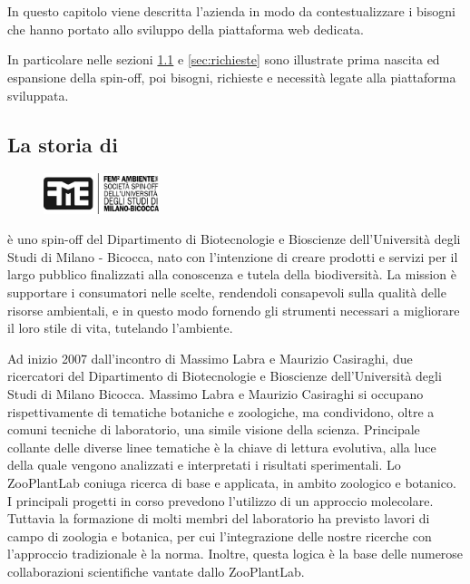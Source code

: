 \chapter{\fem}
\label{chp:fem}

In questo capitolo viene descritta l'azienda \textbf{\femsrl} in modo da contestualizzare i bisogni che hanno portato allo sviluppo della piattaforma web dedicata.

In particolare nelle sezioni \ref{sec:storia-fem} e \ref{sec:richieste} sono illustrate prima nascita ed espansione della spin-off, poi bisogni, richieste e necessità legate alla piattaforma sviluppata.

\section{La storia di \fem}
\label{sec:storia-fem}

\begin{figure}
  \begin{center}
    \includegraphics[width=0.3\textwidth]{images/logo-fem}
  \end{center}
\end{figure}

\textbf{\femsrl} è uno spin-off del Dipartimento di Biotecnologie e Bioscienze dell'Università degli Studi di Milano - Bicocca, nato con l'intenzione di creare prodotti e servizi per il largo pubblico finalizzati alla conoscenza e tutela della biodiversità. La mission è supportare i consumatori nelle scelte, rendendoli consapevoli sulla qualità delle risorse ambientali, e in questo modo fornendo gli strumenti necessari a migliorare il loro stile di vita, tutelando l'ambiente.

Ad inizio 2007 dall'incontro di Massimo Labra e Maurizio Casiraghi, due ricercatori del Dipartimento di Biotecnologie e Bioscienze dell'Università degli Studi di Milano Bicocca. Massimo Labra e Maurizio Casiraghi si occupano rispettivamente di tematiche botaniche e zoologiche, ma condividono, oltre a comuni tecniche di laboratorio, una simile visione della scienza. Principale collante delle diverse linee tematiche è la chiave di lettura evolutiva, alla luce della quale vengono analizzati e interpretati i risultati sperimentali.
Lo ZooPlantLab coniuga ricerca di base e applicata, in ambito zoologico e botanico. I principali progetti in corso prevedono l'utilizzo di un approccio molecolare. Tuttavia la formazione di molti membri del laboratorio ha previsto lavori di campo di zoologia e botanica, per cui l'integrazione delle nostre ricerche con l'approccio tradizionale è la norma. Inoltre, questa logica è la base delle numerose collaborazioni scientifiche vantate dallo ZooPlantLab. 

